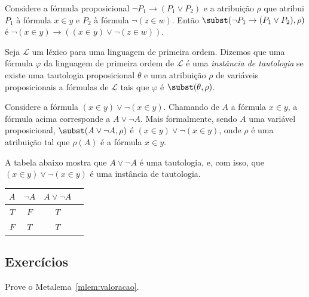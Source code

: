 \begin{example}\label{exa:substituicaoProposicional}
    Considere a fórmula proposicional $\neg P_1 \rightarrow (P_1 \vee P_2)$ e a atribuição $\rho$ que atribui $P_1$ à fórmula $x \in y$ e $P_2$ à fórmula $\neg (z \in w)$.
    Então $\subst(\neg P_1 \rightarrow (P_1 \vee P_2), \rho)$ é $\neg (x \in y) \rightarrow ((x \in y) \vee \neg (z \in w))$.
\end{example}

\begin{metadefinition}\label{mdef:instanciaDeTautologia}
    Seja $\mathcal L$ um léxico para uma linguagem de primeira ordem.
    Dizemos que uma fórmula $\varphi$ da linguagem de primeira ordem de $\mathcal L$ é uma \emph{instância de tautologia} se existe uma tautologia proposicional $\theta$ e uma atribuição $\rho$ de variáveis proposicionais a fórmulas de $\mathcal L$ tais que $\varphi$ é $\subst(\theta,\rho)$.
\end{metadefinition}

\begin{example}\label{exa:instanciaDeTautologia}
    Considere a fórmula $(x \in y) \vee \neg (x \in y)$.
    Chamando de $A$ a fórmula $x \in y$, a fórmula acima corresponde a $A \vee \neg A$.
    Mais formalmente, sendo $A$ uma variável proposicional, $\subst(A \vee \neg A, \rho)$ é $(x \in y) \vee \neg (x \in y)$, onde $\rho$ é uma atribuição tal que $\rho(A)$ é a fórmula $x \in y$.
    
    A tabela abaixo mostra que $A \vee \neg A$ é uma tautologia, e, com isso, que $(x \in y) \vee \neg (x \in y)$ é uma instância de tautologia.

    \begin{center}
        \begin{tabular}{c|c|c|c}
            $A$ & $\neg A$ & $A \vee \neg A$ \\
            \hline
            $T$ & $F$ & $T$ \\
            $F$ & $T$ & $T$
        \end{tabular}
    \end{center}
\end{example}


\subsection*{Exercícios}

\begin{exercise}\label{exr:metalemaValoracao}
    Prove o Metalema~\ref{mlem:valoracao}.
\end{exercise}


